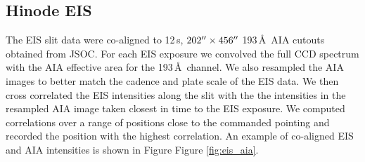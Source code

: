 \documentclass[twocolumn]{aastex62}
\newcommand{\figref}[1]{Figure \ref{#1}}
\begin{document}
\subsection{Hinode EIS}
The EIS slit data were co-aligned to 12\,s, $202\mbox{$^{\prime\prime}$}\times456\mbox{$^{\prime\prime}$}$ 193\,\AA\ AIA cutouts obtained from JSOC. For each EIS exposure we convolved the full CCD spectrum with the AIA effective area for the 193\,\AA\ channel. We also resampled the AIA images to better match the cadence and plate scale of the EIS data. We then cross correlated the EIS intensities along the slit with the the intensities in the resampled AIA image taken closest in time to the EIS exposure. We computed correlations over a range of positions close to the commanded pointing and recorded the position with the highest correlation. An example of co-aligned EIS and AIA intensities is shown in Figure \figref{fig:eis_aia}.
\end{document}
